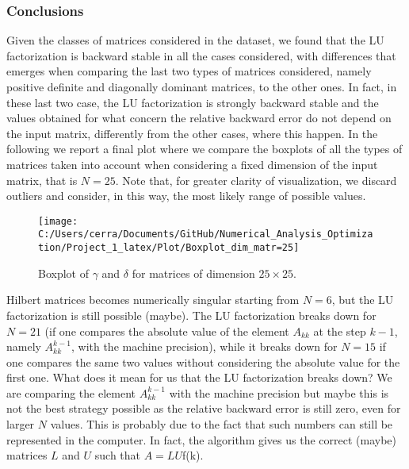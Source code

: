 \documentclass[a4paper,11pt]{report}
\begin{document}
\subsubsection{Conclusions}
Given the classes of matrices considered in the dataset, we found that the LU factorization is backward stable in all the cases considered, with differences that emerges when comparing the last two types of matrices considered, namely positive definite and diagonally dominant matrices, to the other ones. In fact, in these last two case, the LU factorization is strongly backward stable and the values obtained for what concern the relative backward error do not depend on the input matrix, differently from the other cases, where this happen. In the following we report a final plot where we compare the boxplots of all the types of matrices taken into account when considering a fixed dimension of the input matrix, that is $N=25$. Note that, for greater clarity of visualization, we discard outliers and consider, in this way, the most likely range of possible values.

\begin{figure}[H]
	\centering
	\texttt{[image: C:/Users/cerra/Documents/GitHub/Numerical\_Analysis\_Optimization/Project\_1\_latex/Plot/Boxplot\_dim\_matr=25]}
	\caption{Boxplot of $\gamma$ and $\delta$ for matrices of dimension $25\times25$.}
	\label{fig:Boxplot_final}
\end{figure}

\newpage
	Hilbert matrices becomes numerically singular starting from $N=6$, but the LU factorization is still possible (maybe).
	The LU factorization breaks down for $N=21$ (if one compares the absolute value of the element $A_{kk}$ at the step $k-1$, namely $A_{kk}^{k-1}$, with the machine precision), while it breaks down for $N=15$ if one compares the same two values without considering the absolute value for the first one. What does it mean for us that the LU factorization breaks down? We are comparing the element $A_{kk}^{k-1}$ with the machine precision but maybe this is not the best strategy possible as the relative backward error is still zero, even for larger $N$ values. This is probably due to the fact that such numbers can still be represented in the computer. In fact, the algorithm gives us the correct (maybe) matrices $L$ and $U$ such that $A=LU$f(k).
	
	
	
	
\end{document}
